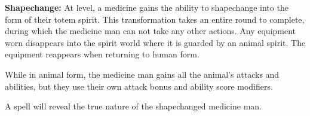 \begin{multicols*}{2}
\textbf{Shapechange:} At  level, a medicine gains the ability to shapechange into the form of their totem spirit. This transformation takes an entire round to complete, during which the medicine man can not take any other actions. Any equipment worn disappears into the spirit world where it is guarded by an animal spirit. The equipment reappears when returning to human form.

While in animal form, the medicine man gains all the animal's attacks and abilities, but they use their own attack bonus and ability score modifiers.

A  spell will reveal the true nature of the shapechanged medicine man.



\end{multicols*}

